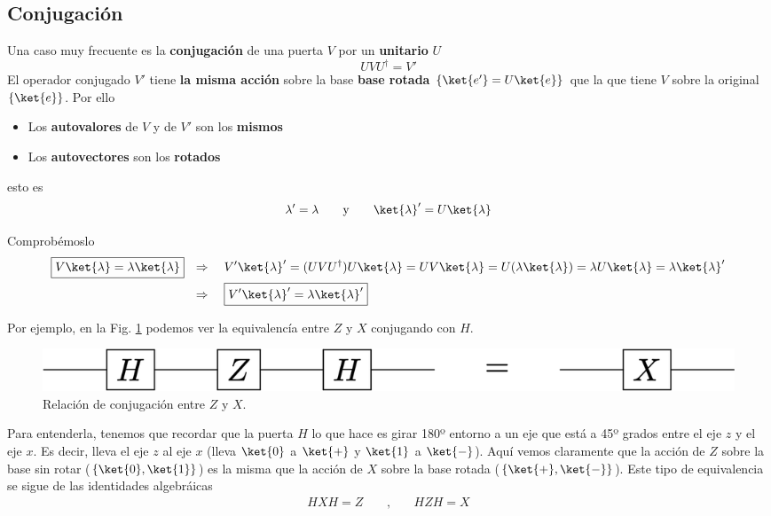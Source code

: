 \documentclass[a4paper,11pt]{book} %
\numberwithin{equation}{chapter}
\def\lch{\left\{}
\def\rch{\right\}}
\begin{document}
        \subsection{Conjugación}

Una caso muy frecuente es la \textbf{conjugación} de una puerta $V$  por un \textbf{unitario} $U$
	\begin{equation}
	U V   U^\dagger = V'  
	\end{equation}
El operador conjugado $V'$ tiene \textbf{la misma acción} sobre la base \textbf{base rotada} $\{\ket{e'} = U\ket{e}\}$ que la que tiene $V$ sobre la original $\{\ket{e}\}$. Por ello
\begin{itemize}
	\item Los \textbf{autovalores} de $V$ y de $V'$ son los \textbf{mismos}
	\item Los \textbf{autovectores} son los \textbf{rotados}
\end{itemize}
esto es
$$
\lambda' = \lambda ~~~~~~\hbox{y}~~~~~~  \ket{\lambda}' = U\ket{\lambda}
$$

	\begin{mybox_blue}{Comprobémoslo}
	\begin{align*}
	\boxed{V \ket{\lambda}= \lambda\ket{\lambda}} & ~~ \Rightarrow ~~~V'\ket{\lambda}' =
	 (UVU^\dagger) U\ket{\lambda} = UV\ket{\lambda} =  U(\lambda\ket{\lambda}) = 
	 \lambda U\ket{\lambda} = \lambda\ket{\lambda}' \\ 
	 & ~~\Rightarrow ~~~ \boxed{ V' \ket{\lambda}' 
	 = \lambda\ket{\lambda}'}
	\end{align*}
	\end{mybox_blue}

Por ejemplo, en la Fig. \ref{Fig_elementos_H_conjugation} podemos ver la equivalencía entre $Z$ y $X$ conjugando con $H$. 
	\begin{figure}[H]
	\centering 
	\includegraphics[width=0.5\linewidth]{Figuras/Fig_elementos_H_conjugation}
	\caption{Relación de conjugación entre $Z$ y $X$.}
	\label{Fig_elementos_H_conjugation}
	\end{figure}
Para entenderla, tenemos que recordar que  la puerta $H$ lo que hace es girar 180º entorno a un eje que está a 45º grados entre el eje $z$ y el eje $x$. Es decir, lleva el eje $z$ al eje $x$ (lleva $\ket{0}$ a $\ket{+}$ y $\ket{1}$ a $\ket{-}$). Aquí vemos claramente que la acción de $Z$ sobre la base sin rotar ($\lch \ket{0}, \ket{1} \rch$) es la misma que la acción de $X$ sobre la base rotada ($\lch \ket{+},\ket{-} \rch $). Este tipo de equivalencia se sigue de las identidades algebráicas
\begin{eqnarray}
HXH = Z ~~~~~&,&~~ ~~~
HZH = X \nonumber
\end{eqnarray}
\end{document}

